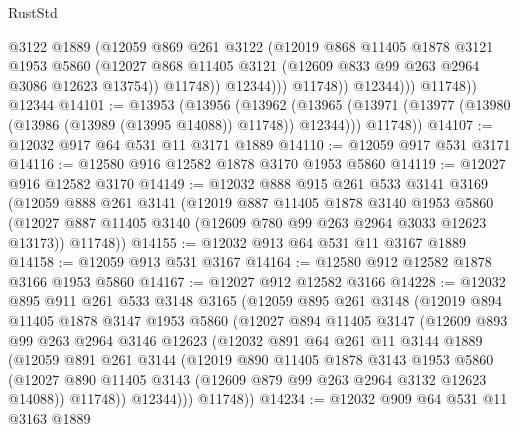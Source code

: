 \begin{lexlean}{RustStd}
\begin{coremodule}
                        @3122
                        @1889
                        (@12059
                          @869
                          @261
                          @3122
                          (@12019
                            @868
                            @11405
                            @1878
                            @3121
                            @1953
                            @5860
                            (@12027
                              @868
                              @11405
                              @3121
                              (@12609 @833 @99 @263 @2964 @3086 @12623 @13754))
                            @11748))
                        @12344)))
                  @11748))
              @12344)))
        @11748))
    @12344
@14101 := @13953
    (@13956
      (@13962
        (@13965 (@13971 (@13977 (@13980 (@13986 (@13989 (@13995 @14088)) @11748)) @12344)))
        @11748))
@14107 := @12032 @917 @64 @531 @11 @3171 @1889
@14110 := @12059 @917 @531 @3171
@14116 := @12580 @916 @12582 @1878 @3170 @1953 @5860
@14119 := @12027 @916 @12582 @3170
@14149 := @12032
    @888
    @915
    @261
    @533
    @3141
    @3169
    (@12059
      @888
      @261
      @3141
      (@12019
        @887
        @11405
        @1878
        @3140
        @1953
        @5860
        (@12027 @887 @11405 @3140 (@12609 @780 @99 @263 @2964 @3033 @12623 @13173))
        @11748))
@14155 := @12032 @913 @64 @531 @11 @3167 @1889
@14158 := @12059 @913 @531 @3167
@14164 := @12580 @912 @12582 @1878 @3166 @1953 @5860
@14167 := @12027 @912 @12582 @3166
@14228 := @12032
    @895
    @911
    @261
    @533
    @3148
    @3165
    (@12059
      @895
      @261
      @3148
      (@12019
        @894
        @11405
        @1878
        @3147
        @1953
        @5860
        (@12027
          @894
          @11405
          @3147
          (@12609
            @893
            @99
            @263
            @2964
            @3146
            @12623
            (@12032
              @891
              @64
              @261
              @11
              @3144
              @1889
              (@12059
                @891
                @261
                @3144
                (@12019
                  @890
                  @11405
                  @1878
                  @3143
                  @1953
                  @5860
                  (@12027 @890 @11405 @3143 (@12609 @879 @99 @263 @2964 @3132 @12623 @14088))
                  @11748))
              @12344)))
        @11748))
@14234 := @12032 @909 @64 @531 @11 @3163 @1889

\end{coremodule}
\end{lexlean}
